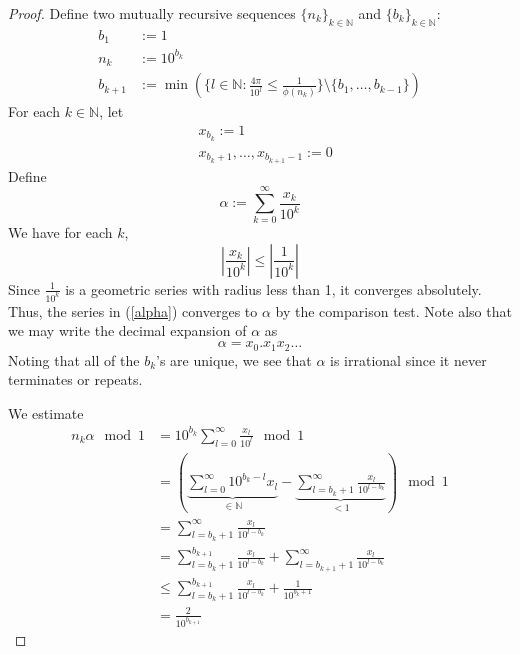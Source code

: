 \documentclass[12pt, reqno]{amsart}
\theoremstyle{definition}
\theoremstyle{remark}
\begin{document}
\begin{itemize}
\begin{proof}
Define two mutually recursive sequences $\{n_{k}\}_{k\in\mathbb{N}}$ and $\{b_{k}\}_{k\in \mathbb{N}}$: 
\begin{align*}
b_{1}&:= 1\\
n_{k}&:= 10^{b_{k}}\\
b_{k+1}&:= \min\left(\{l\in \mathbb{N}: \frac{4\pi}{10^{l}}\le \frac{1}{\phi(n_{k})}\}\setminus \{b_{1},\ldots,b_{k-1}\}\right)
\end{align*}
For each $k\in \mathbb{N}$, let 
\begin{align*}
&x_{b_{k}}:= 1\\
&x_{b_{k}+1},\ldots,x_{b_{k+1}-1}:=0
\end{align*}
Define 
\begin{equation} \label{alpha}
\alpha:=\sum_{k=0}^{\infty} \frac{x_{k}}{10^{k}}
\end{equation}
We have for each $k$, $$\left| \frac{x_{k}}{10^{k}}\right|\le \left| \frac{1}{10^{k}}\right|$$Since $\frac{1}{10^{k}}$ is a geometric series with radius less than 1, it converges absolutely. Thus, the series in (\ref{alpha}) converges to $\alpha$ by the comparison test. Note also that we may write the decimal expansion of $\alpha$ as $$\alpha=x_{0}.x_{1}x_{2}\ldots$$
Noting that all of the $b_{k}$'s are unique, we see that $\alpha$ is irrational since it never terminates or repeats. 

We estimate
\begin{align*}
n_{k}\alpha\mod1&= 10^{b_{k}}\sum_{l=0}^{\infty} \frac{x_{l}}{10^{l}}\mod1\\
&= \left(\underbrace{\sum_{l=0}^{\infty}10^{b_{k}-l}x_{l}}_{\in \mathbb{N}} -\underbrace{\sum_{l= b_{k}+1}^{\infty} \frac{x_{l}}{10^{l-b_{k}}}}_{<1}\right)\mod1\\
&= \sum_{l=b_{k}+1}^{\infty} \frac{x_{l}}{10^{l-b_{k}}}\\
&= \sum_{l=b_{k}+1}^{b_{k+1}} \frac{x_{l}}{10^{l-b_{k}}}+\sum_{l=b_{k+1}+1}^{\infty} \frac{x_{l}}{10^{l-b_{k}}}\\
&\le \sum_{l=b_{k}+1}^{b_{k+1}} \frac{x_{l}}{10^{l-b_{k}}}+ \frac{1}{10^{b_{k}+1}}
\\&= \frac{2}{10^{b_{k+1}}}
\end{align*}


\end{proof}
\end{itemize}
\end{document}
